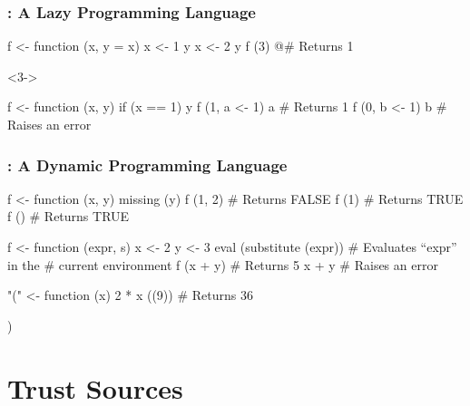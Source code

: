 \documentclass{beamer}
\begin{document}
\begin{frame}[fragile]
    \frametitle{\R{}: A Lazy Programming Language}

\begin{Rcode}
f <- function (x, y = x) {
    x <- 1
    y
    x <- 2
    y
}
f (3)                               @\pause@# Returns 1
\end{Rcode}

\begin{overlayarea}{\textwidth}{3cm}
\begin{onlyenv}<3->
\begin{Rcode}
f <- function (x, y) if (x == 1) y
f (1, a <- 1)
a                                   # Returns 1
f (0, b <- 1)
b                                   # Raises an error
\end{Rcode}
\end{onlyenv}
\end{overlayarea}

\end{frame}

\begin{frame}[fragile]
    \frametitle{\R{}: A Dynamic Programming Language}

\begin{Rcode}
f <- function (x, y) missing (y)
f (1, 2)                            # Returns FALSE
f (1)                               # Returns TRUE
f ()                                # Returns TRUE
\end{Rcode}

\pause

\begin{Rcode}
f <- function (expr, s) {
    x <- 2
    y <- 3
    eval (substitute (expr))        # Evaluates “expr” in the
                                    # current environment
  }
f (x + y)                           # Returns 5
x + y                               # Raises an error
\end{Rcode}

\pause

\begin{Rcode}
"(" <- function (x) 2 * x
((9))                               # Returns 36
\end{Rcode}
\ignore) %

\end{frame}


\section{\R{} Trust Sources}
\end{document}
